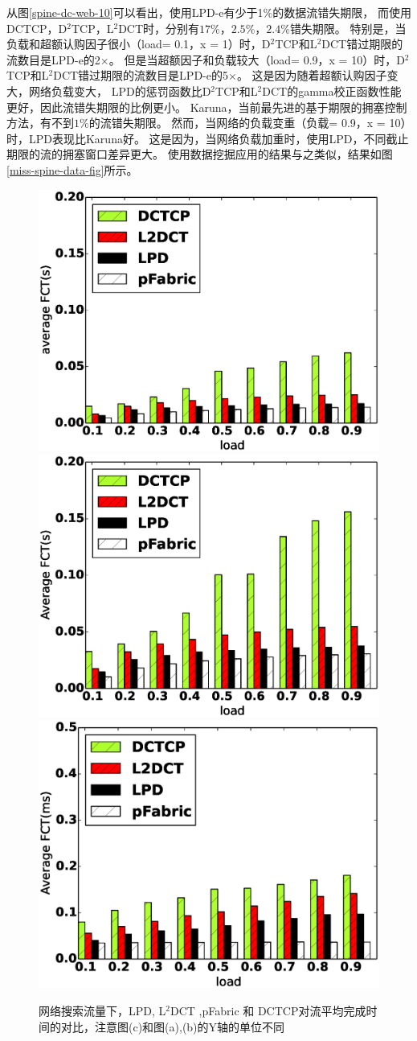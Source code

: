 从图\ref{spine-dc-web-10}可以看出，使用LPD-e有少于1$\%$的数据流错失期限，
而使用DCTCP，D$^2$TCP，L$^2$DCT时，分别有$17\%$，$2.5\%$，$2.4\%$错失期限。
特别是，当负载和超额认购因子很小（load= 0.1，x = 1）时，D$^2$TCP和L$^2$DCT错过期限的流数目是LPD-e的2$\times$。
但是当超额因子和负载较大（load= 0.9，x = 10）时，D$^2$TCP和L$^2$DCT错过期限的流数目是LPD-e的5$\times$。
这是因为随着超额认购因子变大，网络负载变大，
LPD的惩罚函数比D$^2$TCP和L$^2$DCT的gamma校正函数性能更好，因此流错失期限的比例更小。
Karuna，当前最先进的基于期限的拥塞控制方法，有不到$1\%$的流错失期限。
然而，当网络的负载变重（负载= 0.9，x = 10）时，LPD表现比Karuna好。
这是因为，当网络负载加重时，使用LPD，不同截止期限的流的拥塞窗口差异更大。
使用数据挖掘应用的结果与之类似，结果如图\ref{miss-spine-data-fig}所示。


\begin{figure}[h]
\centering
{}
 {\includegraphics[width=0.32\columnwidth]{figures/LPD/spineleaf/FCT_SEARCH_average.eps}}
{\includegraphics[width=0.32\columnwidth]{figures/LPD/spineleaf/FCT_SEARCH_large.eps}}
{\includegraphics[width=0.32\columnwidth]{figures/LPD/spineleaf/FCT_SEARCH_small.eps}}
\caption{网络搜索流量下，LPD, L$^2$DCT ,pFabric 和 DCTCP对流平均完成时间的对比，注意图(c)和图(a),(b)的Y轴的单位不同}
\label{fct-spine-search-5-fig}
\end{figure}



